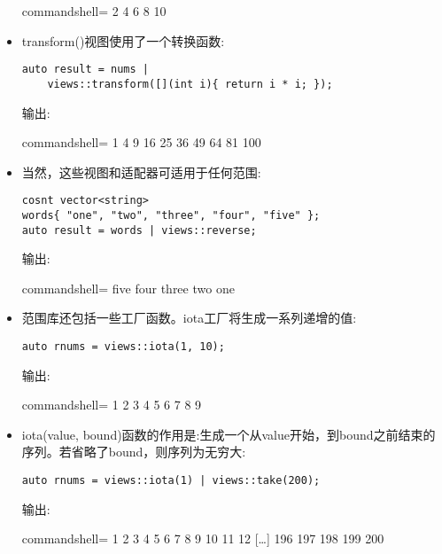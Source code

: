 \begin{itemize}
\begin{tcblisting}{commandshell={}}
2 4 6 8 10
\end{tcblisting}

\item 
transform()视图使用了一个转换函数:

\begin{lstlisting}[style=styleCXX]
auto result = nums |
	views::transform([](int i){ return i * i; });
\end{lstlisting}

输出:

\begin{tcblisting}{commandshell={}}
1 4 9 16 25 36 49 64 81 100
\end{tcblisting}

\item 
当然，这些视图和适配器可适用于任何范围:

\begin{lstlisting}[style=styleCXX]
cosnt vector<string>
words{ "one", "two", "three", "four", "five" };
auto result = words | views::reverse;
\end{lstlisting}

输出:

\begin{tcblisting}{commandshell={}}
five four three two one
\end{tcblisting}

\item 
范围库还包括一些工厂函数。iota工厂将生成一系列递增的值:

\begin{lstlisting}[style=styleCXX]
auto rnums = views::iota(1, 10);
\end{lstlisting}

输出:

\begin{tcblisting}{commandshell={}}
1 2 3 4 5 6 7 8 9
\end{tcblisting}

\item 
iota(value, bound)函数的作用是:生成一个从value开始，到bound之前结束的序列。若省略了bound，则序列为无穷大:

\begin{lstlisting}[style=styleCXX]
auto rnums = views::iota(1) | views::take(200);
\end{lstlisting}

输出:

\begin{tcblisting}{commandshell={}}
1 2 3 4 5 6 7 8 9 10 11 12 […] 196 197 198 199 200
\end{tcblisting}
\end{itemize}


